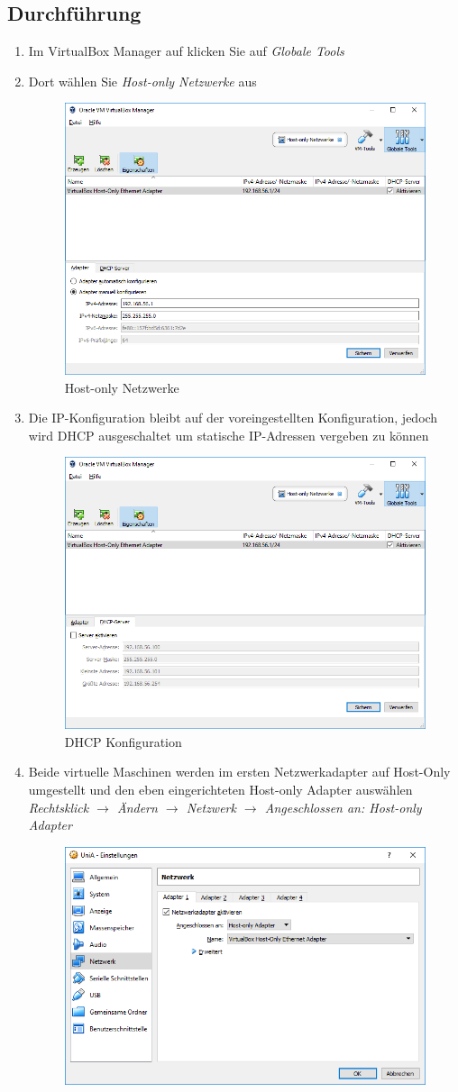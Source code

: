\subsection{Durchführung}
\begin{enumerate}
	\item Im VirtualBox Manager auf klicken Sie auf \textit{Globale Tools}
	\item Dort wählen Sie \textit{Host-only Netzwerke} aus
		\begin{figure}[H]
			\centering
			\includegraphics[width=0.4 \linewidth]{images/6}
			\caption{Host-only Netzwerke}
		\end{figure}
		\item Die IP-Konfiguration bleibt auf der voreingestellten Konfiguration, jedoch wird DHCP ausgeschaltet um statische IP-Adressen vergeben zu können
		\begin{figure}[H]
			\centering
			\includegraphics[width=0.4 \linewidth]{images/7}
			\caption{DHCP Konfiguration}
		\end{figure}
		\item Beide virtuelle Maschinen werden im ersten Netzwerkadapter auf Host-Only umgestellt und den eben eingerichteten Host-only Adapter auswählen \\
		\textit{Rechtsklick $\longrightarrow$ Ändern $\longrightarrow$ Netzwerk $\longrightarrow$ Angeschlossen an: Host-only Adapter}
		\begin{figure}[H]
			\centering
			\includegraphics[width=0.4 \linewidth]{images/8}

\end{figure}
\end{enumerate}
